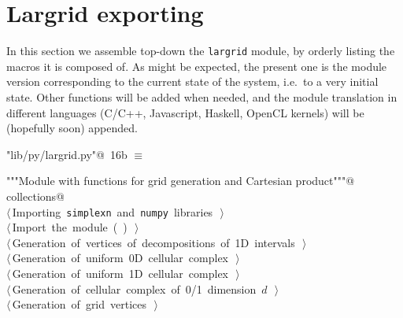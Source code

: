 \documentclass[11pt,oneside]{article}	%
\begin{document}
\section{Largrid exporting}
\label{sec:largrid}
In this section we assemble top-down the \texttt{largrid} module, by orderly listing the macros it is composed of. As might be expected, the present one is the module version corresponding to the current state of the system, i.e.~to a very initial state. Other functions will be added when needed, and the module translation in different languages (C/C++, Javascript, Haskell, OpenCL kernels) will be (hopefully soon) appended.
\begin{flushleft} \small \label{scrap24}
\protect{}\verb@"lib/py/largrid.py"@\nobreak\ {\footnotesize 16b }$\equiv$
\vspace{-1ex}
\begin{list}{}{} \item
\mbox{}\verb@"""Module with functions for grid generation and Cartesian product"""@\\
\mbox{}\verb@import collections@\\
\mbox{}\verb@@\hbox{$\langle\,$Importing \texttt{simplexn} and \texttt{numpy} libraries\nobreak\ {\footnotesize {}}$\,\rangle$}\verb@@\\
\mbox{}\verb@@\hbox{$\langle\,$Import the module\nobreak\ ({\footnotesize {}\label{scrap25}
 }\mbox{}\verb@larcc@ ) {\footnotesize {}}$\,\rangle$}\verb@@\\
\mbox{}\verb@@\hbox{$\langle\,$Generation of vertices of decompositions of 1D intervals\nobreak\ {\footnotesize {}}$\,\rangle$}\verb@@\\
\mbox{}\verb@@\hbox{$\langle\,$Generation of uniform 0D cellular complex\nobreak\ {\footnotesize {}}$\,\rangle$}\verb@@\\
\mbox{}\verb@@\hbox{$\langle\,$Generation of uniform 1D cellular complex\nobreak\ {\footnotesize {}}$\,\rangle$}\verb@@\\
\mbox{}\verb@@\hbox{$\langle\,$Generation of cellular complex of 0/1 dimension $d$\nobreak\ {\footnotesize {}}$\,\rangle$}\verb@@\\
\mbox{}\verb@@\hbox{$\langle\,$Generation of grid vertices\nobreak\ {\footnotesize {}}$\,\rangle$}\verb@@\\

\end{list}
\end{flushleft}
\end{document}
